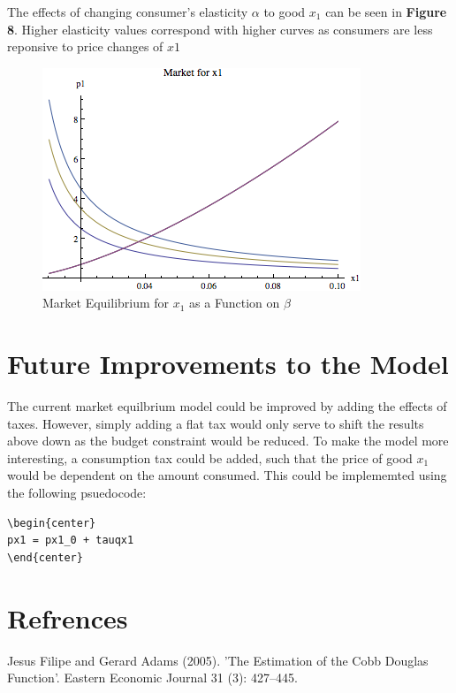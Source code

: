 \documentclass{article}
\begin{document}
The effects of changing consumer's elasticity $\alpha$ to good $x_{1}$ can be seen in {\bf Figure 8}. Higher elasticity values correspond with higher curves as consumers are less reponsive to price changes of $x{1}$

 \begin{figure}[!ht]
	\begin{center}
	\includegraphics[scale=.75]{Figures/MarketEquilBeta}
	\caption{Market Equilibrium for $x_{1}$ as a Function on $\beta$}
	\end{center}
\end{figure}

\section{Future Improvements to the Model}

The current market equilbrium model could be improved by adding the effects of taxes. However, simply adding a flat tax would only serve to shift the results above down as the budget constraint would be reduced. To make the model more interesting, a consumption tax could be added, such that the price of good $x_{1}$ would be dependent on the amount consumed. This could be implememted using the following psuedocode:

\begin{verbatim}
\begin{center}
px1 = px1_0 + tauqx1
\end{center}
\end{verbatim}

\newpage

\section{Refrences}
Jesus Filipe and Gerard Adams (2005). 'The Estimation of the Cobb Douglas Function'. Eastern Economic Journal 31 (3): 427–445. 
\end{document}
